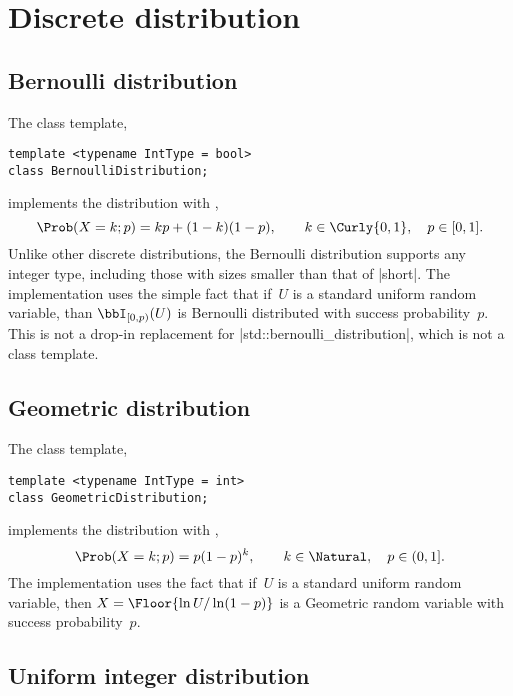 \section{Discrete distribution}
\label{sec:Discrete distribution}

\subsection{Bernoulli distribution}
\label{sub:Bernoulli distribution}

The class template,
\begin{verbatim}
template <typename IntType = bool>
class BernoulliDistribution;
\end{verbatim}
implements the distribution with \pdf,
\begin{equation*}
  \Prob(X = k;p) = kp + (1 - k)(1 - p),\qquad
  k \in \Curly{0, 1},\quad p \in [0, 1].
\end{equation*}
Unlike other discrete distributions, the Bernoulli distribution supports any
integer type, including those with sizes smaller than that of |short|. The
implementation uses the simple fact that if~$U$ is a standard uniform random
variable, than $\bbI_{[0,p)}(U)$ is Bernoulli distributed with success
probability~$p$. This is not a drop-in replacement for
|std::bernoulli_distribution|, which is not a class template.

\subsection{Geometric distribution}
\label{sub:Geometric distribution}

The class template,
\begin{verbatim}
template <typename IntType = int>
class GeometricDistribution;
\end{verbatim}
implements the distribution with \pdf,
\begin{equation*}
  \Prob(X = k;p) = p(1-p)^k,\qquad
  k \in \Natural,\quad p \in (0, 1].
\end{equation*}
The implementation uses the fact that if~$U$ is a standard uniform random
variable, then $X = \Floor{\ln U / \ln(1-p)}$ is a Geometric random variable
with success probability~$p$.

\subsection{Uniform integer distribution}
\label{sub:Uniform integer distribution}

